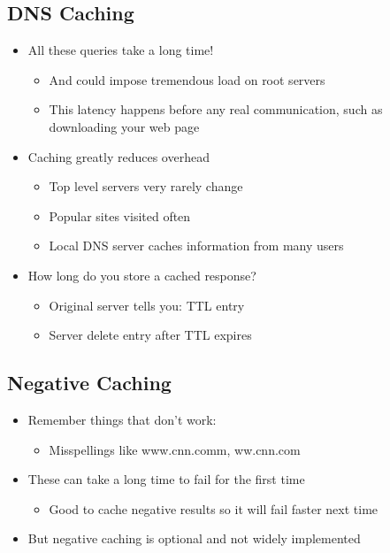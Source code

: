 \subsection{DNS Caching}
\begin{itemize}[nosep]
    \item All these queries take a long time!
          \begin{itemize}[nosep]
              \item And could impose tremendous load on root servers
              \item This latency happens before any real communication, such as downloading your web page
          \end{itemize}
    \item Caching greatly reduces overhead
          \begin{itemize}[nosep]
              \item Top level servers very rarely change
              \item Popular sites visited often
              \item Local DNS server caches information from many users
          \end{itemize}
    \item How long do you store a cached response?
          \begin{itemize}[nosep]
              \item Original server tells you: TTL entry
              \item Server delete entry after TTL expires
          \end{itemize}
\end{itemize}
\subsection{Negative Caching}
\begin{itemize}[nosep]
    \item Remember things that don't work:
          \begin{itemize}[nosep]
              \item Misspellings like www.cnn.comm, ww.cnn.com
          \end{itemize}
    \item These can take a long time to fail for the first time
          \begin{itemize}[nosep]
              \item Good to cache negative results so it will fail faster next time
          \end{itemize}
    \item But negative caching is optional and not widely implemented
\end{itemize}
